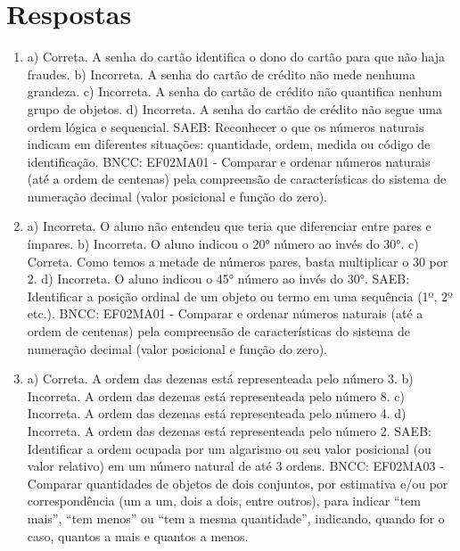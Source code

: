 \chapter{Respostas}
\pagestyle{plain}
\footnotesize

\pagecolor{gray!40}


\begin{enumerate}
\item
a) Correta. A senha do cartão identifica o dono do cartão para que não haja fraudes.
b) Incorreta. A senha do cartão de crédito não mede nenhuma grandeza.
c) Incorreta. A senha do cartão de crédito não quantifica nenhum grupo de objetos.
d) Incorreta. A senha do cartão de crédito não segue uma ordem lógica e sequencial.
SAEB: Reconhecer o que os números naturais indicam em diferentes
situações: quantidade, ordem, medida ou código de identificação.
BNCC: EF02MA01 - Comparar e ordenar números naturais (até a ordem de
centenas) pela compreensão de características do sistema de numeração decimal (valor
posicional e função do zero).

\item
a) Incorreta. O aluno não entendeu que teria que diferenciar entre pares e ímpares.
b) Incorreta. O aluno indicou o 20° número ao invés do 30°.
c) Correta. Como temos a metade de números pares, basta multiplicar o 30 por 2.
d) Incorreta. O aluno indicou o 45° número ao invés do 30°.
SAEB: Identificar a posição ordinal de um objeto ou termo em uma sequência (1º, 2º etc.).
BNCC: EF02MA01 - Comparar e ordenar números naturais (até a ordem de centenas) pela compreensão de características do sistema de numeração decimal (valor
posicional e função do zero).

\item
a) Correta. A ordem das dezenas está representeada pelo número 3.
b) Incorreta. A ordem das dezenas está representeada pelo número 8.
c) Incorreta. A ordem das dezenas está representeada pelo número 4.
d) Incorreta. A ordem das dezenas está representeada pelo número 2.
SAEB: Identificar a ordem ocupada por um algarismo ou seu valor posicional (ou valor relativo) em um número natural de até 3 ordens. BNCC: EF02MA03 - Comparar quantidades de objetos de dois conjuntos, por estimativa e/ou por correspondência (um a um, dois a dois, entre outros), para indicar ``tem mais'', ``tem menos'' ou ``tem a mesma quantidade'', indicando, quando for o caso, quantos a mais e quantos a menos.
\end{enumerate}

